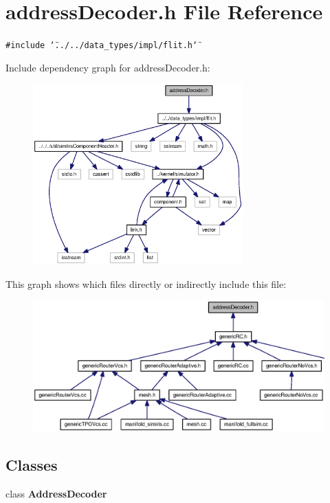 \section{addressDecoder.h File Reference}
\label{addressDecoder_8h}
{\tt \#include \char`\"{}../../data\_\-types/impl/flit.h\char`\"{}}\par


Include dependency graph for addressDecoder.h:\nopagebreak
\begin{figure}[H]
\begin{center}
\leavevmode
\includegraphics[width=229pt]{addressDecoder_8h__incl}
\end{center}
\end{figure}


This graph shows which files directly or indirectly include this file:\nopagebreak
\begin{figure}[H]
\begin{center}
\leavevmode
\includegraphics[width=358pt]{addressDecoder_8h__dep__incl}
\end{center}
\end{figure}
\subsection*{Classes}
\begin{CompactItemize}
\item 
class {\bf AddressDecoder}
\end{CompactItemize}
